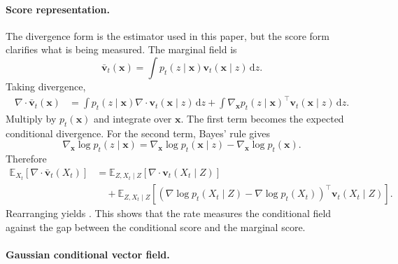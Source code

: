 \documentclass{article}
\newcommand{\E}{\mathbb{E}}
\newcommand{\dd}{\mathrm{d}}
\newcommand{\vx}{\bm{x}}
\newcommand{\vv}{\bm{v}}
\newcommand{\diver}{\nabla\!\cdot}
\theoremstyle{plain}
\theoremstyle{definition}
\theoremstyle{remark}
\begin{document}

\paragraph{Score representation.}
\label{app:score_derivation}

The divergence form is the estimator used in this paper, but the score form clarifies what is being measured. The marginal field is
\begin{equation}
  \bar{\vv}_t(\vx)=\int p_t(z\mid \vx)\vv_t(\vx\mid z)\,\dd z.
\end{equation}
Taking divergence,
\begin{align}
  \diver \bar{\vv}_t(\vx)
  &=
  \int p_t(z\mid\vx)\diver \vv_t(\vx\mid z)\,\dd z
  +
  \int \nabla_{\vx}p_t(z\mid\vx)^\top \vv_t(\vx\mid z)\,\dd z.
\end{align}
Multiply by $p_t(\vx)$ and integrate over $\vx$. The first term becomes the expected conditional divergence. For the second term, Bayes' rule gives
\begin{equation}
  \nabla_{\vx}\log p_t(z\mid\vx)
  =
  \nabla_{\vx}\log p_t(\vx\mid z)
  -
  \nabla_{\vx}\log p_t(\vx).
\end{equation}
Therefore
\begin{align}
  \E_{X_t}\!\left[\diver\bar{\vv}_t(X_t)\right]
  &=
  \E_{Z,X_t\mid Z}\!\left[\diver\vv_t(X_t\mid Z)\right] \nonumber \\
  &\quad+
  \E_{Z,X_t\mid Z}\!\left[
  (\nabla\log p_t(X_t\mid Z)-\nabla\log p_t(X_t))^\top
  \vv_t(X_t\mid Z)
  \right].
\end{align}
Rearranging yields . This shows that the rate measures the conditional field against the gap between the conditional score and the marginal score.

\paragraph{Gaussian conditional vector field.}
\label{app:gaussian_derivation}
\end{document}
